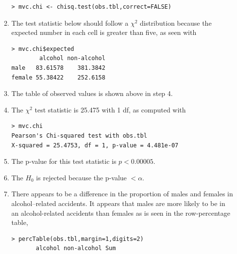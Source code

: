 \documentclass[10pt,openany]{book}\usepackage[]{graphicx}\usepackage[]{color}
\makeatletter
\newenvironment{kframe}{%
 \def\at@end@of@kframe{}%
 \ifinner\ifhmode%
  \def\at@end@of@kframe{\end{minipage}}%
  \begin{minipage}{\columnwidth}%
 \fi\fi%
 \def\FrameCommand##1{\hskip\@totalleftmargin \hskip-\fboxsep
 \colorbox{shadecolor}{##1}\hskip-\fboxsep
     \hskip-\linewidth \hskip-\@totalleftmargin \hskip\columnwidth}%
 \MakeFramed {\advance\hsize-\width
   \@totalleftmargin\z@ \linewidth\hsize
   \@setminipage}}%
 {\par\unskip\endMakeFramed%
 \at@end@of@kframe}
\newenvironment{knitrout}{}{} %
\makeatother
\begin{document}
\begin{itemize}
\begin{enumerate}
\begin{knitrout}
\color{fgcolor}\begin{kframe}
\begin{verbatim}
> mvc.chi <- chisq.test(obs.tbl,correct=FALSE)
\end{verbatim}
\end{kframe}
\end{knitrout}
      \item The test statistic below should follow a $\chi^{2}$ distribution because the expected number in each cell is greater than five, as seen with
\begin{knitrout}
\color{fgcolor}\begin{kframe}
\begin{verbatim}
> mvc.chi$expected
        alcohol non-alcohol
male   83.61578    381.3842
female 55.38422    252.6158
\end{verbatim}
\end{kframe}
\end{knitrout}
      \item The table of observed values is shown above in step 4.
      \item The $\chi^{2}$ test statistic is 25.475 with 1 df, as computed with
\begin{knitrout}
\color{fgcolor}\begin{kframe}
\begin{verbatim}
> mvc.chi
Pearson's Chi-squared test with obs.tbl 
X-squared = 25.4753, df = 1, p-value = 4.481e-07
\end{verbatim}
\end{kframe}
\end{knitrout}
      \item The p-value for this test statistic is $p<0.00005$.
      \item The $H_{0}$ is rejected because the p-value $<\alpha$.
      \item There appears to be a difference in the proportion of males and females in alcohol--related accidents.  It appears that males are more likely to be in an alcohol-related accidents than females as is seen in the row-percentage table,
\begin{knitrout}
\color{fgcolor}\begin{kframe}
\begin{verbatim}
> percTable(obs.tbl,margin=1,digits=2)
       alcohol non-alcohol Sum

\end{verbatim}
\end{kframe}
\end{knitrout}
\end{enumerate}
\end{itemize}
\end{document}
